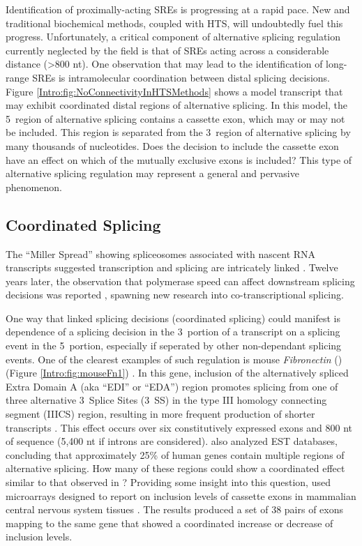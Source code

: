     Identification of proximally-acting SREs is progressing at a rapid pace. New and traditional biochemical methods, coupled with HTS, will undoubtedly fuel this progress. Unfortunately, a critical component of alternative splicing regulation currently neglected by the field is that of SREs acting across a considerable distance (>800 nt). One observation that may lead to the identification of long-range SREs is intramolecular coordination between distal splicing decisions. Figure \ref{Intro:fig:NoConnectivityInHTSMethods} shows a model transcript that may exhibit coordinated distal regions of alternative splicing. In this model, the 5\textprime~region of alternative splicing contains a cassette exon, which may or may not be included. This region is separated from the 3\textprime~region of alternative splicing by many thousands of nucleotides. Does the decision to include the cassette exon have an effect on which of the mutually exclusive exons is included? This type of alternative splicing regulation may represent a general and pervasive phenomenon.

  \subsection{Coordinated Splicing}
    \label{Intro:subsec:Coordination in splicing}

    The ``Miller Spread'' showing spliceosomes associated with nascent RNA transcripts suggested transcription and splicing are intricately linked \citep{Osheim1985}. Twelve years later, the observation that polymerase speed can affect downstream splicing decisions was reported \citep{Cramer1997}, spawning new research into co-transcriptional splicing.

    One way that linked splicing decisions (coordinated splicing) could manifest is dependence of a splicing decision in the 3\textprime~portion of a transcript on a splicing event in the 5\textprime~portion, especially if seperated by other non-dependant splicing events. One of the clearest examples of such regulation is mouse \textit{Fibronectin} (\fn{}) (Figure \ref{Intro:fig:mouseFn1}) \citep{Schwarzbauer1983, White2011a}. In this gene, inclusion of the alternatively spliced Extra Domain A (aka ``EDI'' or ``EDA'') region promotes splicing from one of three alternative 3\textprime~Splice Sites (3\textprime~SS) in the type III homology connecting segment (IIICS) region, resulting in more frequent production of shorter transcripts \citep{Fededa2005}. This effect occurs over six constitutively expressed exons and 800 nt of sequence (5,400 nt if introns are considered). \citet{Fededa2005} also analyzed EST databases, concluding that approximately 25\% of human genes contain multiple regions of alternative splicing. How many of these regions could show a coordinated effect similar to that observed in \fn{}? Providing some insight into this question, \citep{Fagnani2007} used microarrays designed to report on inclusion levels of cassette exons in mammalian central nervous system tissues \citep{Fagnani2007}. The results produced a set of 38 pairs of exons mapping to the same gene that showed a coordinated increase or decrease of inclusion levels. 


